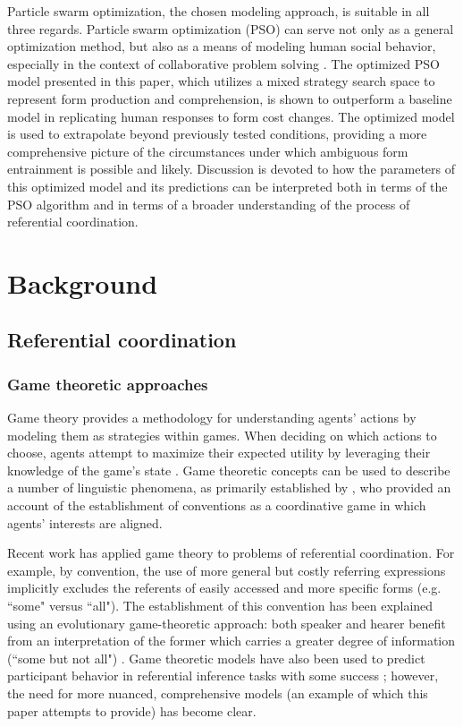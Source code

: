 \documentclass[11pt]{article}
\begin{document}
Particle swarm optimization, the chosen modeling approach, is suitable in all three regards. Particle swarm optimization (PSO) can serve not only as a general optimization method, but also as a means of modeling human social behavior, especially in the context of collaborative problem solving \citep{kennedy1997}. The optimized PSO model presented in this paper, which utilizes a mixed strategy search space to represent form production and comprehension, is shown to outperform a baseline model in replicating human responses to form cost changes. The optimized model is used to extrapolate beyond previously tested conditions, providing a more comprehensive picture of the circumstances under which ambiguous form entrainment is possible and likely. Discussion is devoted to how the parameters of this optimized model and its predictions can be interpreted both in terms of the PSO algorithm and in terms of a broader understanding of the process of referential coordination.



\section{Background}
\subsection{Referential coordination}
\subsubsection{Game theoretic approaches}
Game theory provides a methodology for understanding agents' actions by modeling them as strategies within games. When deciding on which actions to choose, agents attempt to maximize their expected utility by leveraging their knowledge of the game's state \citep{benz2005}. Game theoretic concepts can be used to describe a number of linguistic phenomena, as primarily established by \cite{lewis1969}, who provided an account of the establishment of conventions as a coordinative game in which agents' interests are aligned. 

Recent work has applied game theory to problems of referential coordination. For example, by convention, the use of more general but costly referring expressions implicitly excludes the referents of easily accessed and more specific forms (e.g. ``some" versus ``all"). The establishment of this convention has been explained using an evolutionary game-theoretic approach: both speaker and hearer benefit from an interpretation of the former which carries a greater degree of information (``some but not all") \citep{benz2005}. Game theoretic models have also been used to predict participant behavior in referential inference tasks with some success \citep{degen2012}; however, the need for more nuanced, comprehensive models (an example of which this paper attempts to provide) has become clear. 
\end{document}
